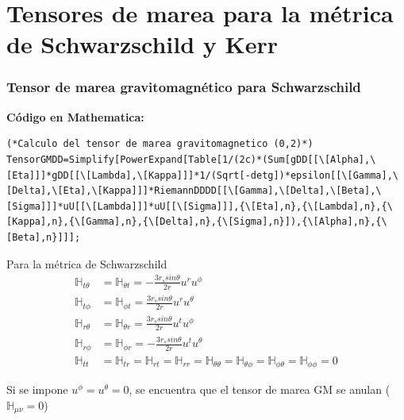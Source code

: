 \documentclass[aspectratio=169,10pt,usenames,dvipsnames,spanish]{beamer}
\begin{document}

\section{Tensores de marea para la métrica de Schwarzschild y Kerr}
\begin{frame}[fragile]
\frametitle{Tensor de marea gravitomagnético para Schwarzschild}

\textbf{Código en Mathematica:}
\begin{lstlisting}[basicstyle=\ttfamily\scriptsize]
(*Calculo del tensor de marea gravitomagnetico (0,2)*)
TensorGMDD=Simplify[PowerExpand[Table[1/(2c)*(Sum[gDD[[\[Alpha],\[Eta]]]*gDD[[\[Lambda],\[Kappa]]]*1/(Sqrt[-detg])*epsilon[[\[Gamma],\[Delta],\[Eta],\[Kappa]]]*RiemannDDDD[[\[Gamma],\[Delta],\[Beta],\[Sigma]]]*uU[[\[Lambda]]]*uU[[\[Sigma]]],{\[Eta],n},{\[Lambda],n},{\[Kappa],n},{\[Gamma],n},{\[Delta],n},{\[Sigma],n}]),{\[Alpha],n},{\[Beta],n}]]];
\end{lstlisting}
Para la métrica de Schwarzschild
\begin{align}
\mathbb{H}_{t\theta}&=\mathbb{H}_{\theta t}=-\frac{3 r_s sin \theta}{2r}u^r u^\phi \\
\mathbb{H}_{t\phi}&=\mathbb{H}_{\phi t}=\frac{3 r_s sin \theta}{2r}u^r u^\theta \\
\mathbb{H}_{r\theta}&=\mathbb{H}_{\theta r}=\frac{3 r_s sin \theta}{2r}u^t u^\phi \\
\mathbb{H}_{r \phi}&=\mathbb{H}_{\phi r}=-\frac{3 r_s sin \theta}{2r}u^t u^\theta \\
\mathbb{H}_{tt}&=\mathbb{H}_{tr}=\mathbb{H}_{rt}=\mathbb{H}_{rr}=\mathbb{H}_{\theta\theta}=\mathbb{H}_{\theta\phi}=\mathbb{H}_{\phi\theta}=\mathbb{H}_{\phi\phi}=0
\end{align}

Si se impone $u^{\phi}=u^{\theta}=0$, se encuentra que el tensor de marea GM se anulan ($\mathbb{H}_{\mu\nu}=0$)
\end{frame}
\end{document}
